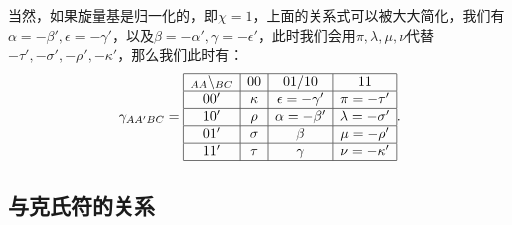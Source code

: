 当然，如果旋量基是归一化的，即$\chi =1$，上面的关系式可以被大大简化，我们有$\alpha =-\beta ',\epsilon =-\gamma '$，以及$\beta =-\alpha ',\gamma =-\epsilon '$，此时我们会用$\pi ,\lambda ,\mu ,\nu $代替$-\tau ',-\sigma ',-\rho ',-\kappa '$，那么我们此时有：
\begin{equation*}
	\gamma _{AA'BC} =\begin{array}{|c|c|c|c|}
		\hline
		_{AA} \setminus _{BC} & 00 & 01/10 & 11\\
		\hline
		00' & \kappa  & \epsilon =-\gamma ' & \pi =-\tau '\\
		\hline
		10' & \rho  & \alpha =-\beta ' & \lambda =-\sigma '\\
		\hline
		01' & \sigma  & \beta  & \mu =-\rho '\\
		\hline
		11' & \tau  & \gamma  & \nu =-\kappa '\\
		\hline
	\end{array} .
\end{equation*}


\subsection{与克氏符的关系}

